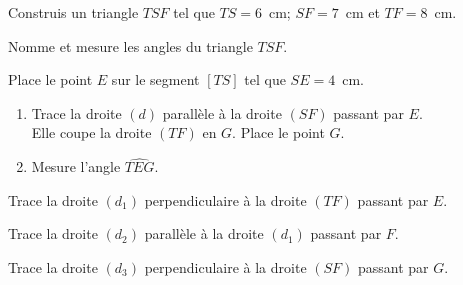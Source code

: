 \begin{myenumerate}
\item Construis un triangle $TSF$ tel que $TS=6$~cm; $SF=7$~cm et
$TF=8$~cm.
\item Nomme et mesure les angles du triangle $TSF$.
\item Place le point $E$ sur le segment $[TS]$ tel que $SE=4$~cm.
\item
\begin{enumerate}
\item Trace la droite $(d)$ parallèle à la droite $(SF)$ passant par
$E$.\\Elle coupe la droite $(TF)$ en $G$. Place le point $G$.
\item Mesure l'angle $\widehat{TEG}$.
\end{enumerate}
\item Trace la droite $(d_1)$ perpendiculaire à la droite $(TF)$
passant par $E$.
\item Trace la droite $(d_2)$ parallèle à la droite $(d_1)$ passant
par $F$.
\item Trace la droite $(d_3)$ perpendiculaire à la droite $(SF)$
passant par $G$.
\end{myenumerate}